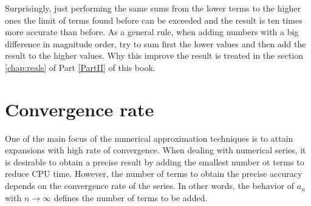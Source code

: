 Surprisingly, just performing the same sums from the lower terms to the higher ones the 
limit of terms found before can be exceeded and the result is ten times more accurate than before. 
As a general rule, when adding numbers with a big difference in magnitude order, 
try to sum first the lower values and then add the result to the higher values. 
Why this improve the result is 
treated in the section \ref{chap:reals} of Part \ref{PartII} of this book.
 
 

\label{numeric_series}











\newpage 
\section{Convergence rate}  \label{sec:convergence} 
One of the main focus of the numerical approximation techniques is to attain expansions with high rate of convergence. When dealing with 
numerical series, it is desirable to obtain a precise result by adding the smallest number ot terms to reduce CPU time. 
However, the number of terms to obtain the precise accuracy depends on the convergence rate of the series.
In other words, the behavior of $ a_n $ with $ n \rightarrow \infty $ defines the number of terms to be added. 



